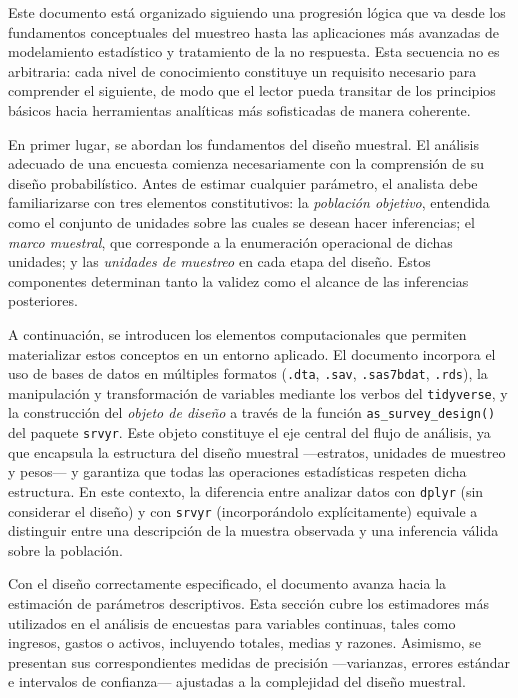 \documentclass[
  spanish,
  12pt,
]{book}
\begin{document}
Este documento está organizado siguiendo una progresión lógica que va desde los fundamentos conceptuales del muestreo hasta las aplicaciones más avanzadas de modelamiento estadístico y tratamiento de la no respuesta. Esta secuencia no es arbitraria: cada nivel de conocimiento constituye un requisito necesario para comprender el siguiente, de modo que el lector pueda transitar de los principios básicos hacia herramientas analíticas más sofisticadas de manera coherente.

En primer lugar, se abordan los fundamentos del diseño muestral. El análisis adecuado de una encuesta comienza necesariamente con la comprensión de su diseño probabilístico. Antes de estimar cualquier parámetro, el analista debe familiarizarse con tres elementos constitutivos: la \emph{población objetivo}, entendida como el conjunto de unidades sobre las cuales se desean hacer inferencias; el \emph{marco muestral}, que corresponde a la enumeración operacional de dichas unidades; y las \emph{unidades de muestreo} en cada etapa del diseño. Estos componentes determinan tanto la validez como el alcance de las inferencias posteriores.

A continuación, se introducen los elementos computacionales que permiten materializar estos conceptos en un entorno aplicado. El documento incorpora el uso de bases de datos en múltiples formatos (\texttt{.dta}, \texttt{.sav}, \texttt{.sas7bdat}, \texttt{.rds}), la manipulación y transformación de variables mediante los verbos del \texttt{tidyverse}, y la construcción del \emph{objeto de diseño} a través de la función \texttt{as\_survey\_design()} del paquete \texttt{srvyr}. Este objeto constituye el eje central del flujo de análisis, ya que encapsula la estructura del diseño muestral ---estratos, unidades de muestreo y pesos--- y garantiza que todas las operaciones estadísticas respeten dicha estructura. En este contexto, la diferencia entre analizar datos con \texttt{dplyr} (sin considerar el diseño) y con \texttt{srvyr} (incorporándolo explícitamente) equivale a distinguir entre una descripción de la muestra observada y una inferencia válida sobre la población.

Con el diseño correctamente especificado, el documento avanza hacia la estimación de parámetros descriptivos. Esta sección cubre los estimadores más utilizados en el análisis de encuestas para variables continuas, tales como ingresos, gastos o activos, incluyendo totales, medias y razones. Asimismo, se presentan sus correspondientes medidas de precisión ---varianzas, errores estándar e intervalos de confianza--- ajustadas a la complejidad del diseño muestral.
\end{document}
